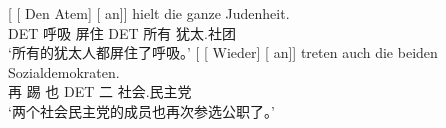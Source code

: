 \begin{exe}
\begin{xlist}[iv.]
\begin{exe}
\begin{xlist}[iv.]
\eal
\label{ex-complex-vf}
\ex
\gll {}[ [ Den Atem]  [ an]] hielt die ganze Judenheit.\footnotemark\\
       {}        {}        DET 呼吸 {}    \partic{}  屏住  DET 所有 犹太.社团\\
\glt `所有的犹太人都屏住了呼吸。'
\ex\label{bsp-wieder-an-tritt-zwei}
\gll {}[ [ Wieder] [ an]] treten auch die beiden Sozialdemokraten.\footnotemark\\
      {}         {}        再   {}        \partic{} 踢 也 DET 二 社会.民主党\\
\glt `两个社会民主党的成员也再次参选公职了。' %


\end{xlist}
\end{exe}
\end{xlist}
\end{exe}
